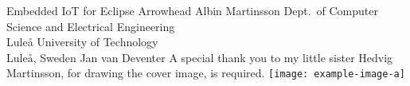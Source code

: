 \documentclass[12pt,a4paper,openright,final,twoside,ieeetran]{main}
\begin{document}
{\parskip=0pt
\def\thesistitle{Embedded IoT for Eclipse Arrowhead}
\def\theauthor{Albin Martinsson}
\def\theaddress{Dept.\ of Computer Science and Electrical Engineering\\
Lule{\aa} University of Technology\\ Lule{\aa}, Sweden}

\def\supervisors{Jan van Deventer}
\def\supervisorstring{Supervisor:} %
\def\dedication{A special thank you to my little sister Hedvig Martinsson, for drawing the cover image, is required.}

\def\theabstract{}
\def\thepreface{}



\def\thelogo{\texttt{[image: example-image-a]} \\ \vspace{1cm}} %


\startpreamble
  {\thesistitle}
  {\theauthor}
  {\theaddress}
  {\supervisors}
  {\dedication}
  {\theabstract}
  {\thepreface}
  {\thelogo}
}
\end{document}
